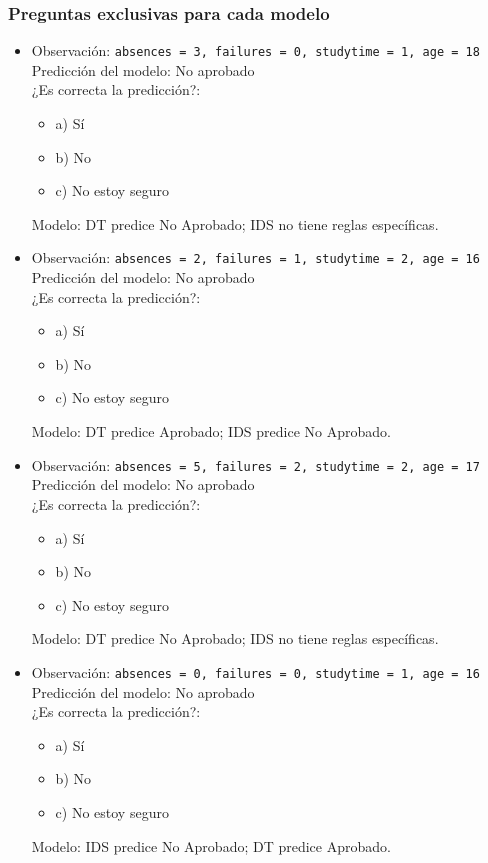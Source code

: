 \subsubsection{Preguntas exclusivas para cada modelo}
\begin{itemize}
    \item Observación: \texttt{absences = 3, failures = 0, studytime = 1, age = 18}\\
    Predicción del modelo: No aprobado\\
    ¿Es correcta la predicción?:
    \begin{itemize}
        \item a) Sí
        \item b) No
        \item c) No estoy seguro
    \end{itemize}
    Modelo: DT predice No Aprobado; IDS no tiene reglas específicas.

    \item Observación: \texttt{absences = 2, failures = 1, studytime = 2, age = 16}\\
    Predicción del modelo: No aprobado\\
    ¿Es correcta la predicción?:
    \begin{itemize}
        \item a) Sí
        \item b) No
        \item c) No estoy seguro
    \end{itemize}
    Modelo: DT predice Aprobado; IDS predice No Aprobado.

    \item Observación: \texttt{absences = 5, failures = 2, studytime = 2, age = 17}\\
    Predicción del modelo: No aprobado\\
    ¿Es correcta la predicción?:
    \begin{itemize}
        \item a) Sí
        \item b) No
        \item c) No estoy seguro
    \end{itemize}
    Modelo: DT predice No Aprobado; IDS no tiene reglas específicas.

    \item Observación: \texttt{absences = 0, failures = 0, studytime = 1, age = 16}\\
    Predicción del modelo: No aprobado\\
    ¿Es correcta la predicción?:
    \begin{itemize}
        \item a) Sí
        \item b) No
        \item c) No estoy seguro
    \end{itemize}
    Modelo: IDS predice No Aprobado; DT predice Aprobado.
\end{itemize}

